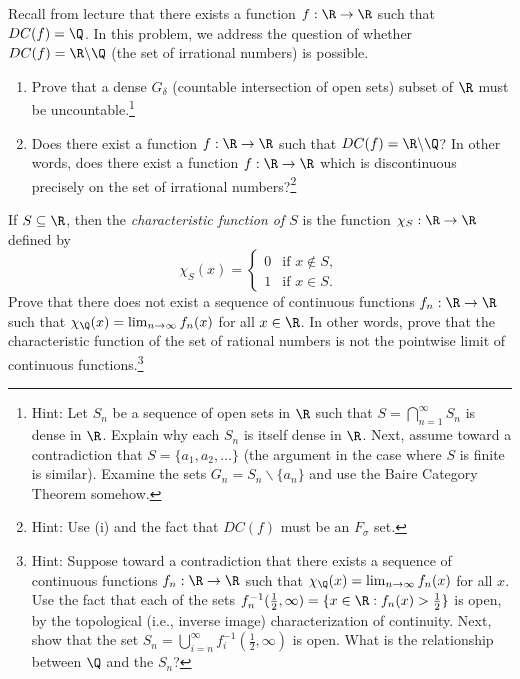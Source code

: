 \documentclass{homework}
\begin{document}
\begin{Exercise}
	Recall from lecture that there exists a function $f:\R\to\R$ such that
	$DC(f) = \Q$.  In this problem, we address the question of
	whether $DC(f) = \R \backslash \Q$ (the set of irrational numbers) is possible.
	\begin{enumerate}
  \item Prove that a dense $G_{\delta}$ (countable intersection of
    open sets) subset of $\R$ must be uncountable.\footnote{Hint: Let
      $S_n$ be a sequence of open sets in $\R$ such that
      $S = \bigcap_{n=1}^{\infty} S_n$ is dense in $\R$.  Explain why
      each $S_n$ is itself dense in $\R$.  Next, assume toward a
      contradiction that $S = \{ a_1,a_2,\ldots\}$ (the argument in
      the case where $S$ is finite is similar).  Examine the sets
      $G_n = S_n \backslash \{a_n\}$ and use the Baire Category
      Theorem somehow.}

    \begin{solution}
    \end{solution}

  \item Does there exist a function $f:\R\to\R$ such that $DC(f) = \R \backslash \Q$?
    In other words, does there exist a function $f:\R\to\R$
    which is discontinuous precisely on the set of irrational numbers?\footnote{Hint:  Use (i)
			and the fact that $DC(f)$ must be an $F_{\sigma}$ set.}

    \begin{solution}
    \end{solution}

	\end{enumerate}
\end{Exercise}

\begin{Exercise}
	If $S \subseteq \R$, then the \emph{characteristic function of $S$}
  is the function $\chi_S:\R\to\R$ defined by
	\begin{equation*}
		\chi_S(x)
		=
		\begin{cases}
			0 & \text{if $x \notin S$},\\
			1 & \text{if $x \in S$}.
		\end{cases}
	\end{equation*}
	Prove that there does not exist a sequence of continuous functions
  $f_n:\R\to\R$ such that $\chi_{\Q}(x) = \lim_{n\to\infty} f_n(x)$
  for all $x \in \R$.  In other words, prove that the characteristic
  function of the set of rational numbers is not the pointwise limit
  of continuous functions.\footnote{Hint: Suppose toward a
    contradiction that there exists a sequence of continuous functions
    $f_n:\R\to\R$ such that $\chi_{\Q}(x) = \lim_{n\to\infty} f_n(x)$
    for all $x$.  Use the fact that each of the sets
    $f^{-1}_n( \tfrac{1}{2}, \infty) = \{ x \in \R : f_n(x) >
    \tfrac{1}{2} \}$ is open, by the topological (i.e., inverse image)
    characterization of continuity.  Next, show that the set
    $S_n = \bigcup_{i=n}^{\infty} f^{-1}_i(\tfrac{1}{2}, \infty)$ is
    open.  What is the relationship between $\Q$ and the $S_n$? }

  \begin{solution}
  \end{solution}
\end{Exercise}
\end{document}
